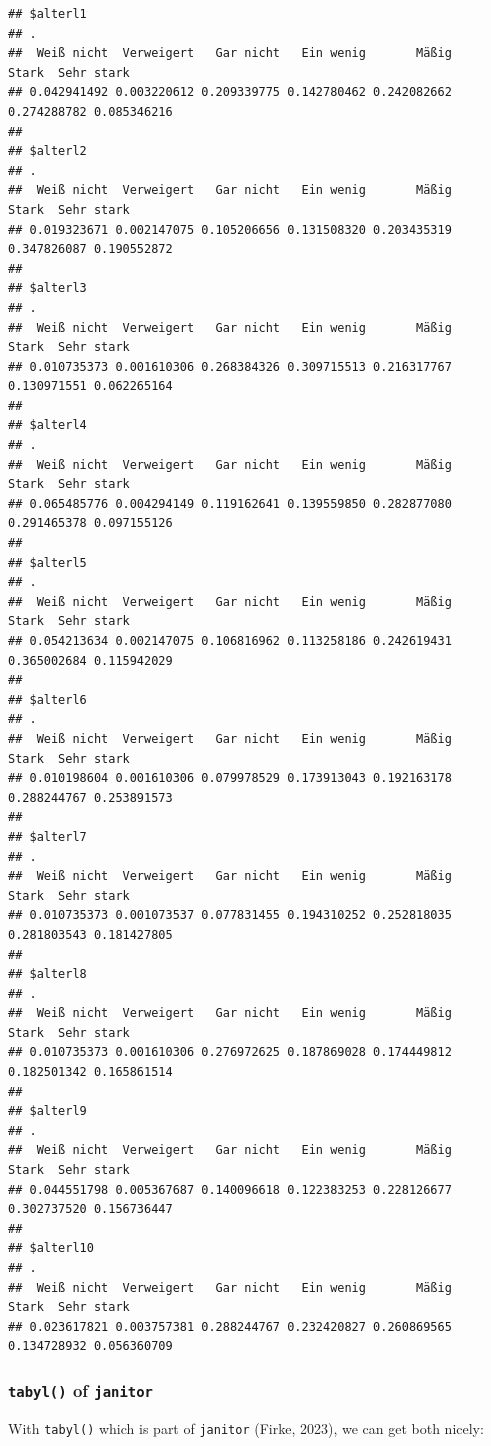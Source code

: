 \documentclass[
  doc]{apa6}
\begin{document}
\begin{verbatim}
## $alterl1
## .
##  Weiß nicht  Verweigert   Gar nicht   Ein wenig       Mäßig       Stark  Sehr stark 
## 0.042941492 0.003220612 0.209339775 0.142780462 0.242082662 0.274288782 0.085346216 
## 
## $alterl2
## .
##  Weiß nicht  Verweigert   Gar nicht   Ein wenig       Mäßig       Stark  Sehr stark 
## 0.019323671 0.002147075 0.105206656 0.131508320 0.203435319 0.347826087 0.190552872 
## 
## $alterl3
## .
##  Weiß nicht  Verweigert   Gar nicht   Ein wenig       Mäßig       Stark  Sehr stark 
## 0.010735373 0.001610306 0.268384326 0.309715513 0.216317767 0.130971551 0.062265164 
## 
## $alterl4
## .
##  Weiß nicht  Verweigert   Gar nicht   Ein wenig       Mäßig       Stark  Sehr stark 
## 0.065485776 0.004294149 0.119162641 0.139559850 0.282877080 0.291465378 0.097155126 
## 
## $alterl5
## .
##  Weiß nicht  Verweigert   Gar nicht   Ein wenig       Mäßig       Stark  Sehr stark 
## 0.054213634 0.002147075 0.106816962 0.113258186 0.242619431 0.365002684 0.115942029 
## 
## $alterl6
## .
##  Weiß nicht  Verweigert   Gar nicht   Ein wenig       Mäßig       Stark  Sehr stark 
## 0.010198604 0.001610306 0.079978529 0.173913043 0.192163178 0.288244767 0.253891573 
## 
## $alterl7
## .
##  Weiß nicht  Verweigert   Gar nicht   Ein wenig       Mäßig       Stark  Sehr stark 
## 0.010735373 0.001073537 0.077831455 0.194310252 0.252818035 0.281803543 0.181427805 
## 
## $alterl8
## .
##  Weiß nicht  Verweigert   Gar nicht   Ein wenig       Mäßig       Stark  Sehr stark 
## 0.010735373 0.001610306 0.276972625 0.187869028 0.174449812 0.182501342 0.165861514 
## 
## $alterl9
## .
##  Weiß nicht  Verweigert   Gar nicht   Ein wenig       Mäßig       Stark  Sehr stark 
## 0.044551798 0.005367687 0.140096618 0.122383253 0.228126677 0.302737520 0.156736447 
## 
## $alterl10
## .
##  Weiß nicht  Verweigert   Gar nicht   Ein wenig       Mäßig       Stark  Sehr stark 
## 0.023617821 0.003757381 0.288244767 0.232420827 0.260869565 0.134728932 0.056360709
\end{verbatim}

\hypertarget{tabyl-of-janitor}{%
\subsubsection{\texorpdfstring{\texttt{tabyl()} of \texttt{janitor}}{tabyl() of janitor}}\label{tabyl-of-janitor}}

With \texttt{tabyl()} which is part of \texttt{janitor} (Firke, 2023), we can get both nicely:
\end{document}
